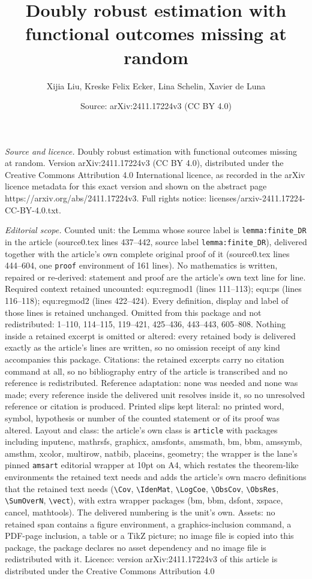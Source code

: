 \documentclass[10pt,a4paper]{amsart}
\title[Doubly robust estimation with functional outcomes missing at]{Doubly robust estimation with functional outcomes missing at random}
\author{Xijia Liu, Kreske Felix Ecker, Lina Schelin, Xavier de Luna}
\date{Source: arXiv:2411.17224v3 (CC BY 4.0)}
\begin{document}
\maketitle

\noindent\emph{Source and licence.} Doubly robust estimation with functional outcomes missing at random. Version arXiv:2411.17224v3 (CC BY 4.0), distributed under the Creative Commons Attribution 4.0 International licence, as recorded in the arXiv licence metadata for this exact version and shown on the abstract page https://arxiv.org/abs/2411.17224v3. Full rights notice: licenses/arxiv-2411.17224-CC-BY-4.0.txt.\par\smallskip

\noindent\textit{Editorial scope.} Counted unit: the Lemma whose source label is \texttt{lemma:finite\_DR} in the article (source0.tex lines 437--442, source label \texttt{lemma:finite\_DR}), delivered together with the article's own complete original proof of it (source0.tex lines 444--604, one \texttt{proof} environment of 161 lines). No mathematics is written, repaired or re-derived: statement and proof are the article's own text line for line. Required context retained uncounted: equ:regmod1 (lines 111--113); equ:ps (lines 116--118); equ:regmod2 (lines 422--424). Every definition, display and label of those lines is retained unchanged. Omitted from this package and not redistributed: 1--110, 114--115, 119--421, 425--436, 443--443, 605--808. Nothing inside a retained excerpt is omitted or altered: every retained body is delivered exactly as the article's lines are written, so no omission receipt of any kind accompanies this package. Citations: the retained excerpts carry no citation command at all, so no bibliography entry of the article is transcribed and no reference is redistributed. Reference adaptation: none was needed and none was made; every reference inside the delivered unit resolves inside it, so no unresolved reference or citation is produced. Printed slips kept literal: no printed word, symbol, hypothesis or number of the counted statement or of its proof was altered. Layout and class: the article's own class is \texttt{article} with packages including inputenc, mathrsfs, graphicx, amsfonts, amsmath, bm, bbm, amssymb, amsthm, xcolor, multirow, natbib, placeins, geometry; the wrapper is the lane's pinned \texttt{amsart} editorial wrapper at 10pt on A4, which restates the theorem-like environments the retained text needs and adds the article's own macro definitions that the retained text needs (\texttt{\textbackslash Cov}, \texttt{\textbackslash IdenMat}, \texttt{\textbackslash LogCoe}, \texttt{\textbackslash ObsCov}, \texttt{\textbackslash ObsRes}, \texttt{\textbackslash SumOverN}, \texttt{\textbackslash vect}), with extra wrapper packages (bm, bbm, dsfont, xspace, cancel, mathtools). The delivered numbering is the unit's own. Assets: no retained span contains a figure environment, a graphics-inclusion command, a PDF-page inclusion, a table or a TikZ picture; no image file is copied into this package, the package declares no asset dependency and no image file is redistributed with it. Licence: version arXiv:2411.17224v3 of this article is distributed under the Creative Commons Attribution 4.0 
\end{document}

